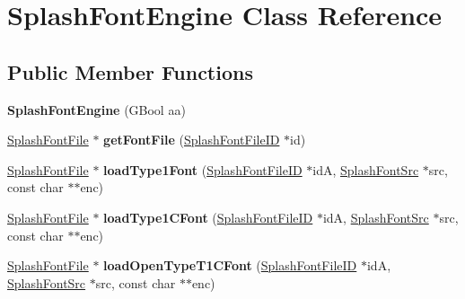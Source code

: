 \hypertarget{class_splash_font_engine}{}\section{Splash\+Font\+Engine Class Reference}
\label{class_splash_font_engine}
\subsection*{Public Member Functions}
\begin{DoxyCompactItemize}
\item 
\mbox{\label{class_splash_font_engine_ada89d8e2f23b6b13ceb711090fa12f5d}} 
{\bfseries Splash\+Font\+Engine} (G\+Bool aa)
\item 
\mbox{\label{class_splash_font_engine_adb076e89b3191b1e2a8c8017c36ca55f}} 
\hyperlink{class_splash_font_file}{Splash\+Font\+File} $\ast$ {\bfseries get\+Font\+File} (\hyperlink{class_splash_font_file_i_d}{Splash\+Font\+File\+ID} $\ast$id)
\item 
\mbox{\label{class_splash_font_engine_a71f335347953b90bd7b827647ca535b4}} 
\hyperlink{class_splash_font_file}{Splash\+Font\+File} $\ast$ {\bfseries load\+Type1\+Font} (\hyperlink{class_splash_font_file_i_d}{Splash\+Font\+File\+ID} $\ast$idA, \hyperlink{class_splash_font_src}{Splash\+Font\+Src} $\ast$src, const char $\ast$$\ast$enc)
\item 
\mbox{\label{class_splash_font_engine_af978b963c64000641d49ae0fc109204e}} 
\hyperlink{class_splash_font_file}{Splash\+Font\+File} $\ast$ {\bfseries load\+Type1\+C\+Font} (\hyperlink{class_splash_font_file_i_d}{Splash\+Font\+File\+ID} $\ast$idA, \hyperlink{class_splash_font_src}{Splash\+Font\+Src} $\ast$src, const char $\ast$$\ast$enc)
\item 
\mbox{\label{class_splash_font_engine_a23129dd45038a10da344ca00b2c74535}} 
\hyperlink{class_splash_font_file}{Splash\+Font\+File} $\ast$ {\bfseries load\+Open\+Type\+T1\+C\+Font} (\hyperlink{class_splash_font_file_i_d}{Splash\+Font\+File\+ID} $\ast$idA, \hyperlink{class_splash_font_src}{Splash\+Font\+Src} $\ast$src, const char $\ast$$\ast$enc)
\item 
$$
\end{DoxyCompactItemize}
